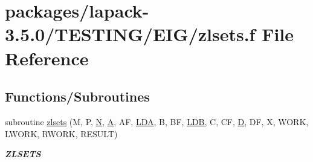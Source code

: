 \hypertarget{zlsets_8f}{}\section{packages/lapack-\/3.5.0/\+T\+E\+S\+T\+I\+N\+G/\+E\+I\+G/zlsets.f File Reference}
\label{zlsets_8f}
\subsection*{Functions/\+Subroutines}
\begin{DoxyCompactItemize}
\item 
subroutine \hyperlink{group__complex16__eig_ga67fc2605422315893d6fec201c155a59}{zlsets} (M, P, \hyperlink{polmisc_8c_a0240ac851181b84ac374872dc5434ee4}{N}, \hyperlink{classA}{A}, A\+F, \hyperlink{example__user_8c_ae946da542ce0db94dced19b2ecefd1aa}{L\+D\+A}, B, B\+F, \hyperlink{example__user_8c_a50e90a7104df172b5a89a06c47fcca04}{L\+D\+B}, C, C\+F, \hyperlink{odrpack_8h_a7dae6ea403d00f3687f24a874e67d139}{D}, D\+F, X, W\+O\+R\+K, L\+W\+O\+R\+K, R\+W\+O\+R\+K, R\+E\+S\+U\+L\+T)
\begin{DoxyCompactList}\small\item\em {\bfseries Z\+L\+S\+E\+T\+S} \end{DoxyCompactList}\end{DoxyCompactItemize}
